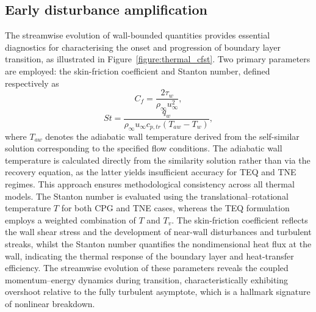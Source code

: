 
\subsection{Early disturbance amplification}

The streamwise evolution of wall-bounded quantities provides essential diagnostics for characterising the onset and progression of boundary layer transition, as illustrated in Figure~\ref{figure:thermal_cfst}. Two primary parameters are employed: the skin-friction coefficient and Stanton number, defined respectively as
\begin{equation}
    C_f = \frac{2\tau_w}{\rho_\infty u_\infty^2},
\end{equation}
\begin{equation}
    St = \frac{q_w}{\rho_\infty u_\infty c_{p,tr} (T_{aw}-T_w)},
\end{equation}
where $T_{aw}$ denotes the adiabatic wall temperature derived from the self-similar solution corresponding to the specified flow conditions. The adiabatic wall temperature is calculated directly from the similarity solution rather than via the recovery equation, as the latter yields insufficient accuracy for \gls{TEQ} and \gls{TNE} regimes. This approach ensures methodological consistency across all thermal models. The Stanton number is evaluated using the translational--rotational temperature $T$ for both \gls{CPG} and \gls{TNE} cases, whereas the \gls{TEQ} formulation employs a weighted combination of $T$ and $T_v$. The skin-friction coefficient reflects the wall shear stress and the development of near-wall disturbances and turbulent streaks, whilst the Stanton number quantifies the nondimensional heat flux at the wall, indicating the thermal response of the boundary layer and heat-transfer efficiency. The streamwise evolution of these parameters reveals the coupled momentum--energy dynamics during transition, characteristically exhibiting overshoot relative to the fully turbulent asymptote, which is a hallmark signature of nonlinear breakdown.

